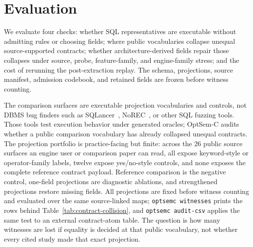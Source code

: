 \section{Evaluation}
\label{sec:eval}
We evaluate four checks: whether SQL representatives are executable without admitting rules or choosing fields; where public vocabularies collapse unequal source-supported contracts; whether architecture-derived fields repair those collapses under source, probe, feature-family, and engine-family stress; and the cost of rerunning the post-extraction replay.  The schema, projections, source manifest, admission codebook, and retained fields are frozen before witness counting.

The comparison surfaces are executable projection vocabularies and controls, not DBMS bug finders such as SQLancer~\cite{rigger2020sqlancer}, NoREC~\cite{rigger2020norec}, or other SQL fuzzing tools.  Those tools test execution behavior under generated oracles; OptSem-C audits whether a public comparison vocabulary has already collapsed unequal contracts.  The projection portfolio is practice-facing but finite: across the 26 public source surfaces an engine user or comparison paper can read, all expose keyword-style or operator-family labels, twelve expose yes/no-style controls, and none exposes the complete reference contract payload.  Reference comparison is the negative control, one-field projections are diagnostic ablations, and strengthened projections restore missing fields.  All projections are fixed before witness counting and evaluated over the same source-linked maps; \texttt{optsemc witnesses} prints the rows behind Table~\ref{tab:contract-collision}, and \texttt{optsemc audit-csv} applies the same test to an external contract-atom table.  The question is how many witnesses are lost if equality is decided at that public vocabulary, not whether every cited study made that exact projection.

